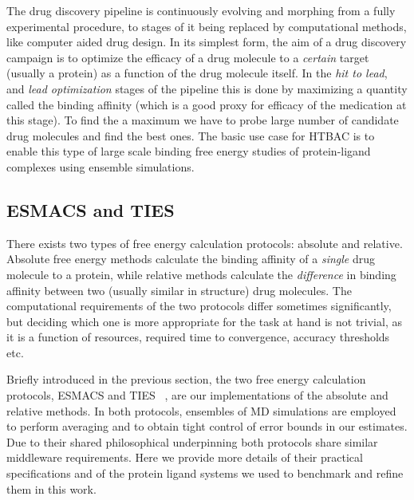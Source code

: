 

The drug discovery pipeline is continuously evolving and morphing from a fully 
experimental procedure, to stages of it being replaced by computational 
methods, like computer aided drug design. In its simplest form, the aim of a 
drug discovery campaign is to optimize the efficacy of a drug molecule to a 
\emph{certain} target (usually a protein) as a function of the drug molecule 
itself. In the \emph{hit to lead}, and \emph{lead optimization} stages of the 
pipeline this is done by maximizing a quantity called the binding affinity 
(which is a good proxy for efficacy of the medication at this stage). To find 
the a maximum we have to probe large number of candidate drug molecules and 
find the best ones. The basic use case for HTBAC is to enable this type of 
large scale binding free energy studies of protein-ligand complexes using 
ensemble simulations. 

\subsection{ESMACS and TIES}\label{ssec:esm_ties}


There exists two types of free energy calculation protocols: absolute and 
relative. Absolute free energy methods calculate the binding affinity of a 
\emph{single} drug molecule to a protein, while relative methods calculate the 
\emph{difference} in binding affinity between two (usually similar in 
structure) drug molecules. The computational requirements of the two protocols 
differ sometimes significantly, but deciding which one is more appropriate for 
the task at hand is not trivial, as it is a function of resources, required 
time to convergence, accuracy thresholds etc.

Briefly introduced in the previous section, the two free energy calculation 
protocols, ESMACS and TIES ~\cite{Wan2017brd4, Bhati2017}, are our 
implementations of the absolute and relative methods. 
In both protocols, ensembles of MD simulations are employed to perform 
averaging and to obtain tight control of error bounds in our estimates.
Due to their shared philosophical underpinning both protocols share similar 
middleware requirements. Here we provide more details of their practical 
specifications and of the protein ligand systems we used to benchmark and refine 
them in this work.

